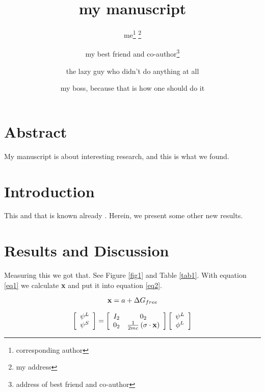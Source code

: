\documentclass{article}
\begin{document}
\title{my manuscript}

\date{}

\author{me\thanks{corresponding author} \thanks{my address}\and my best friend and co-author\thanks{address of best friend and co-author}\and the lazy guy who didn't do anything at all\footnotemark[3]\and my boss, because that is how one should do it\footnotemark[1] \footnotemark[2]}

\maketitle

\section{Abstract}

My manuscript is about interesting research, and this is what we found.

\section{Introduction}

This and that is known already \cite{lita, litb, litc, litd}. Herein, we present some other new results.

\section{Results and Discussion}

Measuring this we got that. See Figure \ref{fig1} and Table \ref{tab1}. With equation \ref{eq1} we calculate {\bf{x}} and put it into equation \ref{eq2}.

\begin{equation}
{\bf{x}}=a+\Delta G_{free}
\label{eq1}
\end{equation}



\begin{equation}
\left[\begin{array}{c}
\psi^{L}\\
\psi^{S}
\end{array}\right]=\left[\begin{array}{cc}
I_{2} & 0_{2}\\
0_{2} & \frac{1}{2mc}\left(\sigma\cdot\bf{x}\right)
\end{array}\right]\left[\begin{array}{c}
\psi^{L}\\
\phi^{L}
\end{array}\right]
\label{eq2}
\end{equation}
\end{document}
